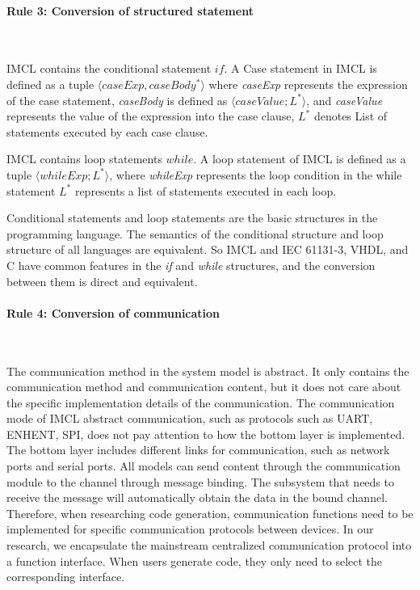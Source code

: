 \paragraph{\textbf{Rule 3: Conversion of structured statement}} \

IMCL contains the conditional statement $if$. A Case statement in IMCL is defined as a tuple $\langle caseExp, caseBody^{*} \rangle$ where \emph{caseExp} represents the expression of the case statement, \emph{caseBody} is defined as $\langle caseValue; L^{*} \rangle$, and \emph{caseValue} represents the value of the expression into the case clause, $L^{*}$ denotes List of statements executed by each case clause.

IMCL contains loop statements $while$. A loop statement of IMCL is defined as a tuple $\langle whileExp; L^* \rangle$, where \emph{whileExp} represents the loop condition in the while statement $L^*$ represents a list of statements executed in each loop.

Conditional statements and loop statements are the basic structures in the programming language. The semantics of the conditional structure and loop structure of all languages are equivalent. So IMCL and IEC 61131-3, VHDL, and C have common features in the \emph{if} and \emph{while} structures, and the conversion between them is direct and equivalent.


\paragraph{\textbf{Rule 4: Conversion of communication}} \

The communication method in the system model is abstract. It only contains the communication method and communication content, but it does not care about the specific implementation details of the communication. The communication mode of IMCL abstract communication, such as protocols such as UART, ENHENT, SPI, does not pay attention to how the bottom layer is implemented. The bottom layer includes different links for communication, such as network ports and serial ports. All models can send content through the communication module to the channel through message binding. The subsystem that needs to receive the message will automatically obtain the data in the bound channel. Therefore, when researching code generation, communication functions need to be implemented for specific communication protocols between devices. In our research, we encapsulate the mainstream centralized communication protocol into a function interface. When users generate code, they only need to select the corresponding interface.

